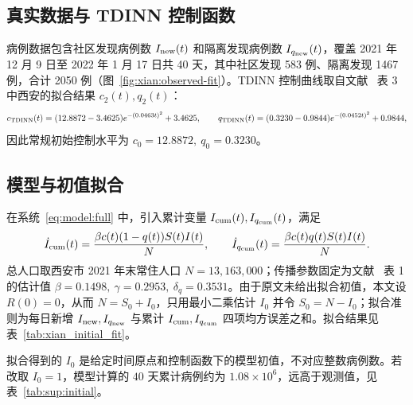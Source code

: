 \documentclass[lang=cn,a4paper,newtx]{elegantpaper}
\numberwithin{equation}{section}
\theoremstyle{plain}
\begin{document}
\subsection{真实数据与 TDINN 控制函数}
病例数据包含社区发现病例数 $I_{\rm new}(t)$ 和隔离发现病例数 $I_{q_{\rm new}}(t)$，覆盖 2021 年 12 月 9 日至 2022 年 1 月 17 日共 40 天，其中社区发现 583 例、隔离发现 1467 例，合计 2050 例（图~\ref{fig:xian:observed-fit}）。TDINN 控制曲线取自文献~\cite{He2023TDINN} 表 3 中西安的拟合结果 $c_2(t),q_2(t)$：
\begin{equation}
c_{\rm TDINN}(t)=(12.8872-3.4625)e^{-(0.0463t)^2}+3.4625,\qquad
q_{\rm TDINN}(t)=(0.3230-0.9844)e^{-(0.0452t)^2}+0.9844,
\end{equation}
因此常规初始控制水平为 $c_0=12.8872,\ q_0=0.3230$。



\subsection{模型与初值拟合}
在系统~\eqref{eq:model:full} 中，引入累计变量 $I_{\rm cum}(t),I_{q_{\rm cum}}(t)$，满足
\begin{equation}
\dot I_{\rm cum}(t)=\frac{\beta c(t)(1-q(t))S(t)I(t)}{N},\qquad
\dot I_{q_{\rm cum}}(t)=\frac{\beta c(t)q(t)S(t)I(t)}{N}.
\end{equation}
总人口取西安市 2021 年末常住人口 $N=13{,}163{,}000$；传播参数固定为文献~\cite{He2023TDINN} 表 1 的估计值 $\beta=0.1498,\ \gamma=0.2953,\ \delta_q=0.3531$。由于原文未给出拟合初值，本文设 $R(0)=0$，从而 $N=S_0+I_0$，只用最小二乘估计 $I_0$ 并令 $S_0=N-I_0$；拟合准则为每日新增 $I_{\rm new},I_{q_{\rm new}}$ 与累计 $I_{\rm cum},I_{q_{\rm cum}}$ 四项均方误差之和。拟合结果见表~\ref{tab:xian_initial_fit}。

拟合得到的 $I_0$ 是给定时间原点和控制函数下的模型初值，不对应整数病例数。若改取 $I_0=1$，模型计算的 $40$ 天累计病例约为 $1.08\times10^6$，远高于观测值，见表~\ref{tab:sup:initial}。
\end{document}
